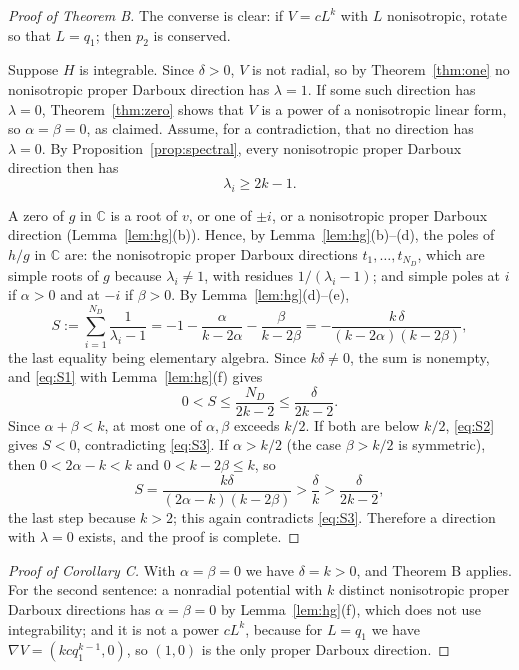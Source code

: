 \documentclass[11pt]{article}
\numberwithin{equation}{section}
\theoremstyle{definition}
\theoremstyle{remark}
\newcommand{\C}{\mathbb C}
\begin{document}
\begin{proof}[Proof of Theorem B]
The converse is clear: if $V=cL^k$ with $L$ nonisotropic, rotate so that $L=q_1$; then $p_2$ is conserved.

Suppose $H$ is integrable. Since $\delta>0$, $V$ is not radial, so by Theorem~\ref{thm:one} no nonisotropic proper
Darboux direction has $\lambda=1$. If some such direction has $\lambda=0$, Theorem~\ref{thm:zero} shows that $V$ is a
power of a nonisotropic linear form, so $\alpha=\beta=0$, as claimed. Assume, for a contradiction, that no direction
has $\lambda=0$. By Proposition~\ref{prop:spectral}, every nonisotropic proper Darboux direction then has
\begin{equation}\label{eq:S1}
\lambda_i\ge2k-1 .
\end{equation}

A zero of $g$ in $\C$ is a root of $v$, or one of $\pm i$, or a nonisotropic proper Darboux direction
(Lemma~\ref{lem:hg}(b)). Hence, by Lemma~\ref{lem:hg}(b)--(d), the poles of $h/g$ in $\C$ are: the nonisotropic
proper Darboux directions $t_1,\dots,t_{N_D}$, which are simple roots of $g$ because $\lambda_i\ne1$, with residues
$1/(\lambda_i-1)$; and simple poles at $i$ if $\alpha>0$ and at $-i$ if $\beta>0$. By Lemma~\ref{lem:hg}(d)--(e),
\begin{equation}\label{eq:S2}
S:=\sum_{i=1}^{N_D}\frac{1}{\lambda_i-1}=-1-\frac{\alpha}{k-2\alpha}-\frac{\beta}{k-2\beta}
=-\frac{k\,\delta}{(k-2\alpha)(k-2\beta)} ,
\end{equation}
the last equality being elementary algebra. Since $k\delta\ne0$, the sum is nonempty, and \eqref{eq:S1} with
Lemma~\ref{lem:hg}(f) gives
\begin{equation}\label{eq:S3}
0<S\le\frac{N_D}{2k-2}\le\frac{\delta}{2k-2}.
\end{equation}
Since $\alpha+\beta<k$, at most one of $\alpha,\beta$ exceeds $k/2$. If both are below $k/2$, \eqref{eq:S2} gives
$S<0$, contradicting \eqref{eq:S3}. If $\alpha>k/2$ (the case $\beta>k/2$ is symmetric), then $0<2\alpha-k<k$ and
$0<k-2\beta\le k$, so
\[
S=\frac{k\delta}{(2\alpha-k)(k-2\beta)}>\frac{\delta}{k}>\frac{\delta}{2k-2},
\]
the last step because $k>2$; this again contradicts \eqref{eq:S3}. Therefore a direction with $\lambda=0$ exists, and
the proof is complete.
\end{proof}

\begin{proof}[Proof of Corollary C]
With $\alpha=\beta=0$ we have $\delta=k>0$, and Theorem B applies. For the second sentence: a nonradial potential
with $k$ distinct nonisotropic proper Darboux directions has $\alpha=\beta=0$ by Lemma~\ref{lem:hg}(f), which does not
use integrability; and it is not a power $cL^k$, because for $L=q_1$ we have $\nabla V=(kcq_1^{k-1},0)$, so $(1,0)$ is
the only proper Darboux direction.
\end{proof}
\end{document}
